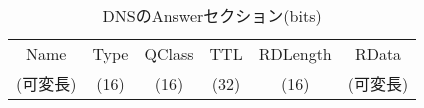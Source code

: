 \begin{table}[htbp]
 \caption{DNSのAnswerセクション(bits)}
 \centering
  \begin{tabular}{|c|c|c|c|c|c|}
    \toprule
		Name & Type & QClass & TTL & RDLength & RData\\
		(可変長) & (16) & (16) & (32) & (16) & (可変長)\\
    \bottomrule
  \end{tabular}
 \label{tab:answer-dns}
\end{table}
